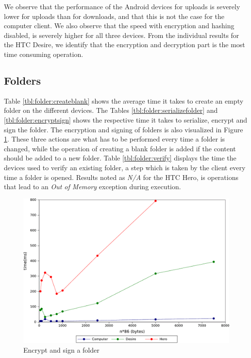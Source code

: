 \documentclass[pdftex,english,10pt,b5paper,twoside]{book}
\begin{document}
We observe that the performance of the Android devices for uploads is severely
lower for uploads than for downloads, and that this is not the case for the
computer client. We also observe that the speed with encryption and hashing
disabled, is severely higher for all three devices. From the individual
results for the HTC Desire, we identify that the encryption and decryption
part is the most time consuming operation.

\subsection{Folders}

Table \ref{tbl:folder:createblank} shows the average time it takes to create an
empty folder on the different devices. The Tables
\ref{tbl:folder:serializefolder} and \ref{tbl:folder:encryptsign} shows the
respective time it takes to serialize, encrypt and sign the folder. The
encryption and signing of folders is also visualized in Figure
\ref{fig:results:signencrypt}. These three actions are what has to be performed
every time a folder is changed, while the operation of creating a blank folder
is added if the content should be added to a new folder. Table
\ref{tbl:folder:verify} displays the time the devices used to verify an
existing folder, a step which is taken by the client every time a folder is
opened. Results noted as \emph{N/A} for the HTC Hero, is operations that lead
to an \emph{Out of Memory} exception during execution.




\begin{figure}[h!]
    \centering
    \includegraphics[scale=0.6]{graph_signandencrypt.pdf}
    \caption{Encrypt and sign a folder}
    \label{fig:results:signencrypt}
\end{figure}

\end{document}
